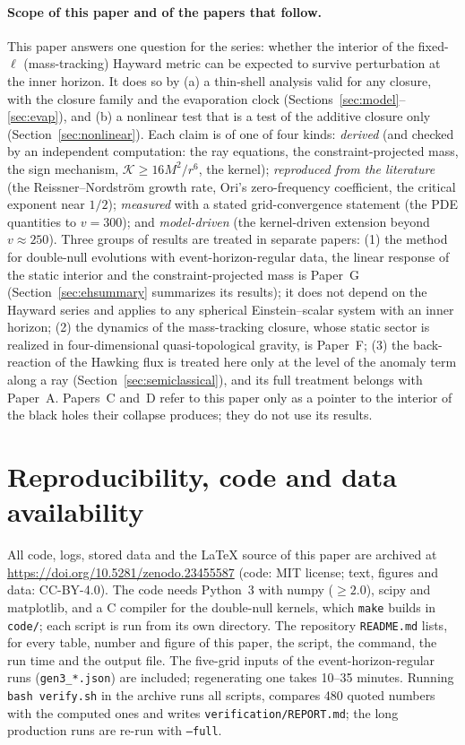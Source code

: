 \documentclass[11pt]{article}
\begin{document}
\paragraph{Scope of this paper and of the papers that follow.} This paper answers one question for the series: whether the interior of the fixed-$\ell$ (mass-tracking) Hayward metric can be expected to survive perturbation at the inner horizon. It does so by (a) a thin-shell analysis valid for any closure, with the closure family and the evaporation clock (Sections~\ref{sec:model}--\ref{sec:evap}), and (b) a nonlinear test that is a test of the additive closure only (Section~\ref{sec:nonlinear}). Each claim is of one of four kinds: \emph{derived} (and checked by an independent computation: the ray equations, the constraint-projected mass, the sign mechanism, $\mathcal K\ge16M^2/r^6$, the kernel); \emph{reproduced from the literature} (the Reissner--Nordstr\"om growth rate, Ori's zero-frequency coefficient, the critical exponent near $1/2$); \emph{measured} with a stated grid-convergence statement (the PDE quantities to $v=300$); and \emph{model-driven} (the kernel-driven extension beyond $v\approx250$). Three groups of results are treated in separate papers: (1) the method for double-null evolutions with event-horizon-regular data, the linear response of the static interior and the constraint-projected mass is Paper~G (Section~\ref{sec:ehsummary} summarizes its results); it does not depend on the Hayward series and applies to any spherical Einstein--scalar system with an inner horizon; (2) the dynamics of the mass-tracking closure, whose static sector is realized in four-dimensional quasi-topological gravity, is Paper~F; (3) the back-reaction of the Hawking flux is treated here only at the level of the anomaly term along a ray (Section~\ref{sec:semiclassical}), and its full treatment belongs with Paper~A. Papers~C \citep{PaperC} and~D \citep{PaperD} refer to this paper only as a pointer to the interior of the black holes their collapse produces; they do not use its results.

\section*{Reproducibility, code and data availability}
\raggedright
All code, logs, stored data and the \LaTeX{} source of this paper are archived at \url{https://doi.org/10.5281/zenodo.23455587} (code: MIT license; text, figures and data: CC-BY-4.0). The code needs Python~3 with numpy ($\ge2.0$), scipy and matplotlib, and a C compiler for the double-null kernels, which \texttt{make} builds in \texttt{code/}; each script is run from its own directory. The repository \texttt{README.md} lists, for every table, number and figure of this paper, the script, the command, the run time and the output file. The five-grid inputs of the event-horizon-regular runs (\texttt{gen3\_*.json}) are included; regenerating one takes 10--35 minutes. Running \texttt{bash verify.sh} in the archive runs all scripts, compares 480 quoted numbers with the computed ones and writes \texttt{verification/REPORT.md}; the long production runs are re-run with \texttt{--full}.
\end{document}
